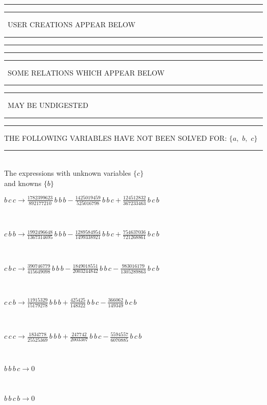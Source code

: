 \rule[2pt]{6in}{1pt}\hfil\break
\rule[2.5pt]{1.701in}{1pt}
\ USER CREATIONS APPEAR BELOW\ 
\rule[2.5pt]{1.701in}{1pt}\hfil\break
\rule[2pt]{6in}{1pt}\hfil\break
\rule[2pt]{6in}{4pt}\hfil\break
\rule[2pt]{1.45in}{4pt}
\ SOME RELATIONS WHICH APPEAR BELOW\ 
\rule[2pt]{1.45in}{4pt}\hfil\break
\rule[2pt]{2.18in}{4pt}
\ MAY BE UNDIGESTED\ 
\rule[2pt]{2.18in}{4pt}\hfil\break
\rule[2pt]{6in}{4pt}\hfil\break
THE FOLLOWING VARIABLES HAVE NOT BEEN SOLVED FOR:\hfil\break
$\{a,
$ $
b,
$ $
c\}$
\smallskip\\
\rule[3pt]{6in}{.7pt}\\
The expressions with unknown variables $\{c\}$\\
and knowns $\{b\}$\smallskip\\
\begin{minipage}{6in}
$
b\,
 c\,
 c\rightarrow \frac{1782399623}{892177210}\,
 b\,
 b\,
 b - \frac{1425019459}{525016798}\,
 b\,
 b\,
 c + \frac{124512832}{367233463}\,
 b\,
 c\,
 b
$
\end{minipage}\medskip \\
\begin{minipage}{6in}
$
c\,
 b\,
 b\rightarrow \frac{1992496648}{1367314695}\,
 b\,
 b\,
 b - \frac{1289584954}{1499338921}\,
 b\,
 b\,
 c + \frac{754637036}{721268861}\,
 b\,
 c\,
 b
$
\end{minipage}\medskip \\
\begin{minipage}{6in}
$
c\,
 b\,
 c\rightarrow \frac{390746779}{415649098}\,
 b\,
 b\,
 b - \frac{1849018551}{2003244842}\,
 b\,
 b\,
 c - \frac{983016179}{1305289863}\,
 b\,
 c\,
 b
$
\end{minipage}\medskip \\
\begin{minipage}{6in}
$
c\,
 c\,
 b\rightarrow \frac{11915329}{15179278}\,
 b\,
 b\,
 b + \frac{425425}{148322}\,
 b\,
 b\,
 c - \frac{366062}{149349}\,
 b\,
 c\,
 b
$
\end{minipage}\medskip \\
\begin{minipage}{6in}
$
c\,
 c\,
 c\rightarrow \frac{1834778}{25525369}\,
 b\,
 b\,
 b + \frac{247742}{2003307}\,
 b\,
 b\,
 c - \frac{5594557}{6070885}\,
 b\,
 c\,
 b
$
\end{minipage}\medskip \\
\begin{minipage}{6in}
$
b\,
 b\,
 b\,
 c\rightarrow 0
$
\end{minipage}\medskip \\
\begin{minipage}{6in}
$
b\,
 b\,
 c\,
 b\rightarrow 0
$
\end{minipage}\\
